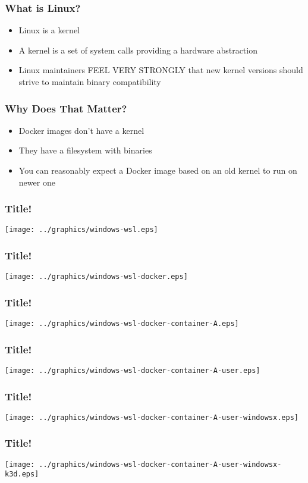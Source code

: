     \begin{frame}
    \frametitle{What is Linux?}
    \begin{itemize}
        \item Linux is a kernel\pause
        \item A kernel is a set of system calls providing a hardware abstraction\pause
        \item Linux maintainers FEEL VERY STRONGLY that new kernel versions should strive to maintain binary compatibility
    \end{itemize}
    \end{frame}

    \begin{frame}
      \frametitle{Why Does That Matter?}
      \begin{itemize}
      \item Docker images don't have a kernel\pause
      \item They have a filesystem with binaries\pause
      \item You can reasonably expect a Docker image based on an old kernel to run on newer one
      \end{itemize}
    \end{frame}

    \begin{frame}
      \frametitle{Title!}
      \texttt{[image: ../graphics/windows-wsl.eps]}
    \end{frame}

    \begin{frame}
      \frametitle{Title!}
      \texttt{[image: ../graphics/windows-wsl-docker.eps]}
    \end{frame}

    \begin{frame}
      \frametitle{Title!}
      \texttt{[image: ../graphics/windows-wsl-docker-container-A.eps]}
    \end{frame}

    \begin{frame}
      \frametitle{Title!}
      \texttt{[image: ../graphics/windows-wsl-docker-container-A-user.eps]}
    \end{frame}

    \begin{frame}
      \frametitle{Title!}
      \texttt{[image: ../graphics/windows-wsl-docker-container-A-user-windowsx.eps]}
    \end{frame}

    \begin{frame}
      \frametitle{Title!}
      \texttt{[image: ../graphics/windows-wsl-docker-container-A-user-windowsx-k3d.eps]}
    \end{frame}


